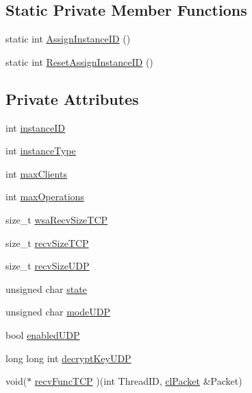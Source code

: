 \subsection*{Static Private Member Functions}
\begin{DoxyCompactItemize}
\item 
static int \hyperlink{classcl_instance_setup_ae958e001782f87e3d4a8588aa46d7423}{AssignInstanceID} ()
\item 
static int \hyperlink{classcl_instance_setup_ae5afd30ceb932796fd244c1aaf139433}{ResetAssignInstanceID} ()
\end{DoxyCompactItemize}
\subsection*{Private Attributes}
\begin{DoxyCompactItemize}
\item 
int \hyperlink{classcl_instance_setup_aca3c51adce99fa0900b023a4ab313a57}{instanceID}
\item 
int \hyperlink{classcl_instance_setup_a655807bb682504ab13a93e273263a445}{instanceType}
\item 
int \hyperlink{classcl_instance_setup_a3a536e872b3739d5eedcf68d8362733f}{maxClients}
\item 
int \hyperlink{classcl_instance_setup_aab4429f5f5e4dbb03e0ac7b57a367cbb}{maxOperations}
\item 
size\_\-t \hyperlink{classcl_instance_setup_afe672b3b90ea27d8a7761f1ffc4a4cd6}{wsaRecvSizeTCP}
\item 
size\_\-t \hyperlink{classcl_instance_setup_a89cd87a06080b11b12b79039a6e94c7b}{recvSizeTCP}
\item 
size\_\-t \hyperlink{classcl_instance_setup_af5e4d3fb91a77f2e31ca2171de9750b5}{recvSizeUDP}
\item 
unsigned char \hyperlink{classcl_instance_setup_a16da9e8e5cd44f8062f02101222102fc}{state}
\item 
unsigned char \hyperlink{classcl_instance_setup_aa367a51b021c0750ff667177d5a961ca}{modeUDP}
\item 
bool \hyperlink{classcl_instance_setup_ae27488feccbe024221bcb6f8c19f8eae}{enabledUDP}
\item 
long long int \hyperlink{classcl_instance_setup_a376b285bccbb1c1400bcceea53bd8dda}{decryptKeyUDP}
\item 
void($\ast$ \hyperlink{classcl_instance_setup_ad42bce75edecf44786bdc6bbbe46154b}{recvFuncTCP} )(int ThreadID, \hyperlink{classcl_packet}{clPacket} \&Packet)

\end{DoxyCompactItemize}
